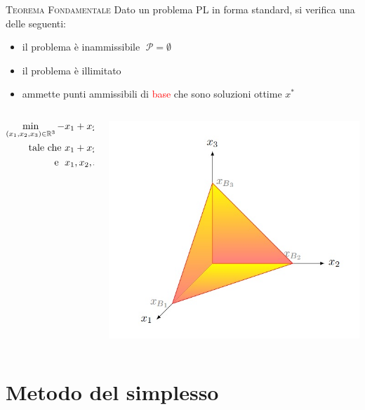 \begin{frame}[t]{\textsc{\LARGE Teorema Fondamentale}}
	Dato un problema PL in forma standard, si verifica una delle seguenti: %
	\pause
\begin{itemize}
\item il problema è inammissibile $\;\mathcal{P}=\emptyset$\pause
\item il problema è illimitato\pause
\item ammette punti ammissibili di  \textcolor{red}{base} che sono soluzioni ottime $x^{*}$
\end{itemize}
\pause
\begin{columns}
\begin{column}{0.4\textwidth}
\begin{align*}
\min\limits_{(x_{1},x_{2},x_{3})\in\mathbb{R}^{3}} -&x_{1}+ x_{2}-4x_{3}\\
\text{tale che    }&x_{1}+x_{2}+x_{3}=1,\\
\text{\; e   \;} &x_{1}, x_{2}, x_{3} \geq 0
\end{align*}
\end{column}
\pause
\begin{column}{0.4\textwidth}
	\includegraphics[width=\columnwidth]{Feas.jpg}
\end{column}
\end{columns}
\end{frame}


\section{Metodo del simplesso}

